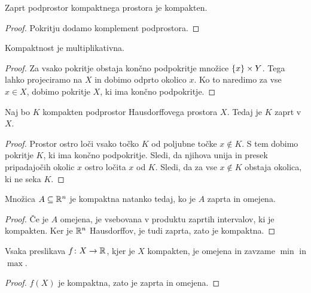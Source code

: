 \begin{trditev}
Zaprt podprostor kompaktnega prostora je kompakten.
\end{trditev}

\begin{proof}
Pokritju dodamo komplement podprostora.
\end{proof}

\begin{izrek}
Kompaktnost je multiplikativna.
\end{izrek}

\begin{proof}
Za vsako pokritje obstaja končno podpokritje množice
$\left\{x\right\} \times Y$. Tega lahko projeciramo na $X$ in dobimo odprto
okolico $x$. Ko to naredimo za vse $x \in X$, dobimo pokritje $X$,
ki ima končno podpokritje.
\end{proof}


\begin{trditev}
\label{td:1}
Naj bo $K$ kompakten podprostor Hausdorffovega prostora $X$. Tedaj
je $K$ zaprt v $X$.
\end{trditev}

\begin{proof}
Prostor ostro loči vsako točko $K$ od poljubne točke
$x \not \in K$. S tem dobimo pokritje $K$, ki ima končno
podpokritje. Sledi, da njihova unija in presek pripadajočih okolic
$x$ ostro ločita $x$ od $K$. Sledi, da za vse $x \not \in K$
obstaja okolica, ki ne seka $K$.
\end{proof}

\begin{izrek}
Množica $A \subseteq \mathbb{R}^n$ je kompaktna natanko tedaj, ko je $A$
zaprta in omejena.
\end{izrek}

\begin{proof}
Če je $A$ omejena, je vsebovana v produktu zaprtih intervalov, ki
je kompakten. Ker je $\mathbb{R}^n$ Hausdorffov, je tudi zaprta, zato je
kompaktna.
\end{proof}

\begin{posledica}
Vsaka preslikava $f \colon X \to \mathbb{R}$, kjer je $X$ kompakten, je
omejena in zavzame $\min$ in $\max$.
\end{posledica}

\begin{proof}
$f(X)$ je kompaktna, zato je zaprta in omejena.
\end{proof}

